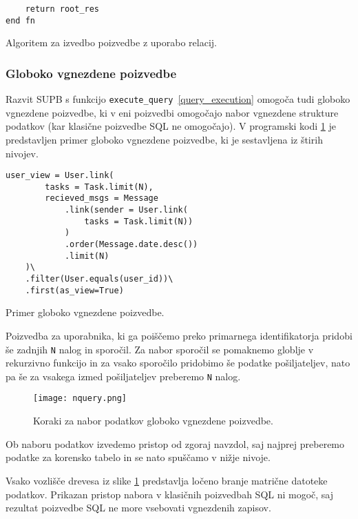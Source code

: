 \documentclass[a4paper,12pt,openright]{book}
\begin{document}
\begin{itemize}
\begin{code}
\begin{verbatim}
    return root_res
end fn
\end{verbatim}
\caption{Algoritem za izvedbo poizvedbe z uporabo relacij.}
\label{execute_query_algorithm}
\end{code}

        \newpage
        \subsubsection{Globoko vgnezdene poizvedbe}

        Razvit SUPB s funkcijo {\tt execute\_query}~\ref{query_execution} omogoča tudi globoko vgnezdene poizvedbe, ki v eni poizvedbi omogočajo nabor vgnezdene strukture podatkov (kar klasične poizvedbe SQL ne omogočajo). V programski kodi \ref{deep_nested_query} je predstavljen primer globoko vgnezdene poizvedbe, ki je sestavljena iz štirih nivojev.

\newpage
\begin{code}
\begin{verbatim}
user_view = User.link(
        tasks = Task.limit(N),
        recieved_msgs = Message
            .link(sender = User.link(
                tasks = Task.limit(N))
            )
            .order(Message.date.desc())
            .limit(N)
    )\
    .filter(User.equals(user_id))\
    .first(as_view=True)
\end{verbatim}
\caption{Primer globoko vgnezdene poizvedbe.}
\label{deep_nested_query}
\end{code}

        Poizvedba za uporabnika, ki ga poiščemo preko primarnega identifikatorja pridobi še zadnjih {\tt N} nalog in sporočil. Za nabor sporočil se pomaknemo globlje v rekurzivno funkcijo in za vsako sporočilo pridobimo še podatke pošiljateljev, nato pa še za vsakega izmed pošiljateljev preberemo {\tt N} nalog.

        \begin{figure}[H]
            \centerline{\texttt{[image: nquery.png]}}
            \caption{Koraki za nabor podatkov globoko vgnezdene poizvedbe.}
            \label{deep_nested_query}
        \end{figure}

        Ob naboru podatkov izvedemo pristop od zgoraj navzdol, saj najprej preberemo podatke za korensko tabelo in se nato spuščamo v nižje nivoje.

        Vsako vozlišče drevesa iz slike \ref{deep_nested_query} predstavlja ločeno branje matrične datoteke podatkov. Prikazan pristop nabora v klasičnih poizvedbah SQL ni mogoč, saj rezultat poizvedbe SQL ne more vsebovati vgnezdenih zapisov.


\end{itemize}
\end{document}
